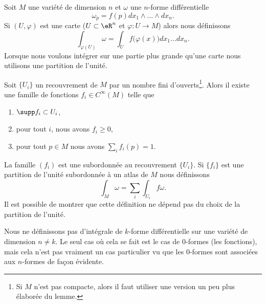Soit \( M\) une variété de dimension \( n\) et \( \omega\) une \( n\)-forme différentielle
\begin{equation}
    \omega_p=f(p)dx_1\wedge\ldots\wedge dx_n.
\end{equation}
 Si \( (U,\varphi)\) est une carte (\( U\subset\eR^n\) et \( \varphi\colon U\to M\)) alors nous définissons
\begin{equation}
    \int_{\varphi(U)}\omega=\int_{U}f\big( \varphi(x) \big)dx_1\ldots dx_n.     
\end{equation}
Lorsque nous voulons intégrer sur une partie plus grande qu'une carte nous utilisons une partition de l'unité.
\begin{lemma}   \label{LemGPmRGZ}
    Soit \( \{ U_i \}\) un recouvrement de \( M\) par un nombre fini d'ouverts\footnote{Si \( M\) n'est pas compacte, alors il faut utiliser une version un peu plus élaborée du lemme\cite{SpindelGeomDoff}.}. Alors il existe une famille de fonctions \( f_i\in  C^{\infty}(M)\) telle que
    \begin{enumerate}
        \item
            \( \supp f_i\subset U_i\),
        \item
            pour tout \( i\), nous avons \( f_i\geq 0\),
        \item
            pour tout \( p\in M\) nous avons \( \sum_i f_i(p)=1\).
    \end{enumerate}
\end{lemma}
La famille \( (f_i)\) est une  subordonnée au recouvrement \( \{ U_i \}\). Si \( \{ f_i \}\) est une partition de l'unité subordonnée à un atlas de \( M\) nous définissons
\begin{equation}
    \int_M\omega=\sum_i\int_{U_i}f\omega.
\end{equation}
Il est possible de montrer que cette définition ne dépend pas du choix de la partition de l'unité.

\begin{remark}
    Nous ne définissons pas d'intégrale de \( k\)-forme différentielle sur une variété de dimension \( n\neq k\). Le seul cas où cela se fait est le cas de \( 0\)-formes (les fonctions), mais cela n'est pas vraiment un cas particulier vu que les \( 0\)-formes sont associées aux \( n\)-formes de façon évidente.
\end{remark}

